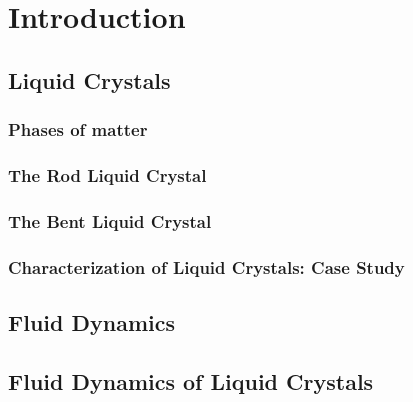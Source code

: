 \documentclass[aagreenthesis.tex]{subfiles}
\begin{document}
\chapter{Introduction}
\section{Liquid Crystals}
\subsection{Phases of matter}
\subsection{The Rod Liquid Crystal}
\subsection{The Bent Liquid Crystal}
\subsection{Characterization of Liquid Crystals: Case Study}
\label{test}
\section{Fluid Dynamics}
\section{Fluid Dynamics of Liquid Crystals}
\end{document}
